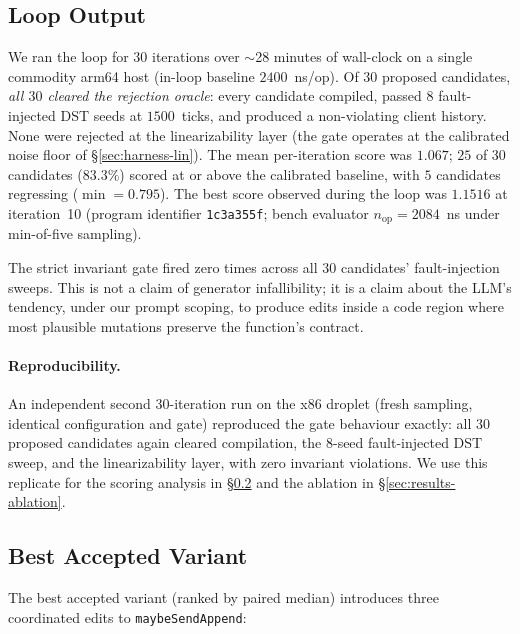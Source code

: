 \documentclass{article}
\begin{document}
\subsection{Loop Output}
\label{sec:results-loop}
We ran the loop for $30$ iterations over $\sim$28 minutes of wall-clock
on a single commodity arm64 host (in-loop baseline $2400$~ns/op). Of
$30$ proposed candidates, \emph{all $30$ cleared
the rejection oracle}: every candidate compiled, passed $8$
fault-injected DST seeds at $1500$~ticks, and produced a
non-violating client history. None were
rejected at the linearizability layer (the gate operates at the
calibrated noise floor of \S\ref{sec:harness-lin}). The mean per-iteration
score was $1.067$; $25$ of $30$ candidates ($83.3\%$) scored at or
above the calibrated baseline, with $5$ candidates regressing
($\min=0.795$). The best score observed during the loop was
$1.1516$ at iteration~10 (program identifier
\texttt{1c3a355f}; bench evaluator $n_\text{op}=2084$~ns under
min-of-five sampling).

The strict invariant gate fired zero times across all $30$
candidates' fault-injection sweeps. This is not a claim of generator
infallibility; it is a claim about the LLM's tendency, under our
prompt scoping, to produce edits inside a code region where most
plausible mutations preserve the function's contract.

\paragraph{Reproducibility.}
An independent second $30$-iteration run on the x86 droplet (fresh
sampling, identical configuration and gate) reproduced the gate
behaviour exactly: all
$30$ proposed candidates again cleared compilation, the $8$-seed
fault-injected DST sweep, and the linearizability layer, with zero
invariant violations. We use this replicate for the scoring analysis
in \S\ref{sec:results-variants} and the ablation in
\S\ref{sec:results-ablation}.

\subsection{Best Accepted Variant}
\label{sec:results-variants}
The best accepted variant (ranked by paired median) introduces three
coordinated edits to \texttt{maybeSendAppend}:
\end{document}

